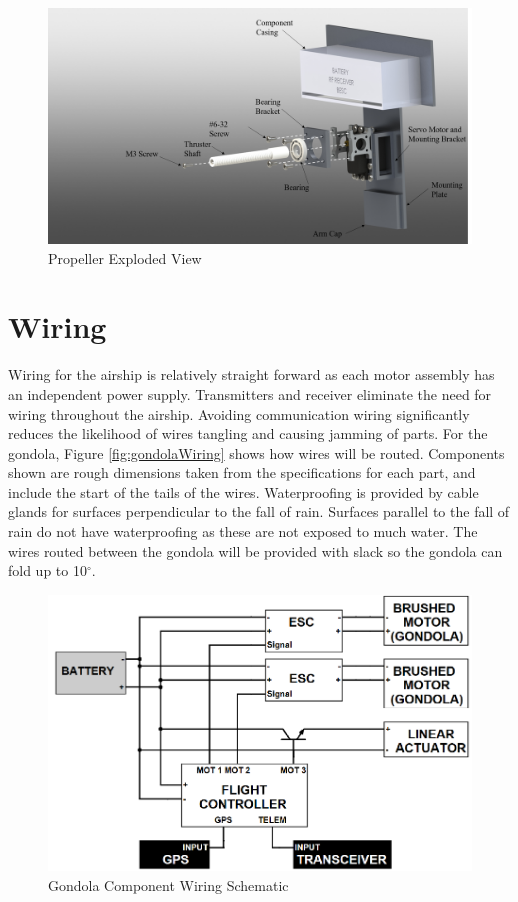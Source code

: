 \documentclass[../main.tex]{subfiles}
\begin{document}
\begin{figure}[H]
	\centering
	\includegraphics[width=.8\linewidth]{img/design/thruster/shaftAssembly.png}
	\caption{Propeller Exploded View}
	\label{fig:propAssembly}
\end{figure}

\section{Wiring}
Wiring for the airship is relatively straight forward as each motor assembly has an  independent power supply. Transmitters and receiver eliminate the need for wiring throughout the airship. Avoiding communication wiring significantly reduces the likelihood of wires tangling and causing jamming of parts. For the gondola, Figure \ref{fig:gondolaWiring} shows how wires will be routed. Components shown are rough dimensions taken from the specifications for each part, and include the start of the tails of the wires. Waterproofing is provided by cable glands for surfaces perpendicular to the fall of rain. Surfaces parallel to the fall of rain do not have waterproofing as these are not exposed to much water. The wires routed between the gondola will be provided with slack so the gondola can fold up to 10$^{\circ}$.
\\

\begin{figure}[H]
	\centering
	\includegraphics[width=.8\linewidth]{img/design/gondola/gondolaWiringSchematic.png}
	\caption{Gondola Component Wiring Schematic}
	\label{fig:gondolaWiringSchematic}
\end{figure}
\end{document}
